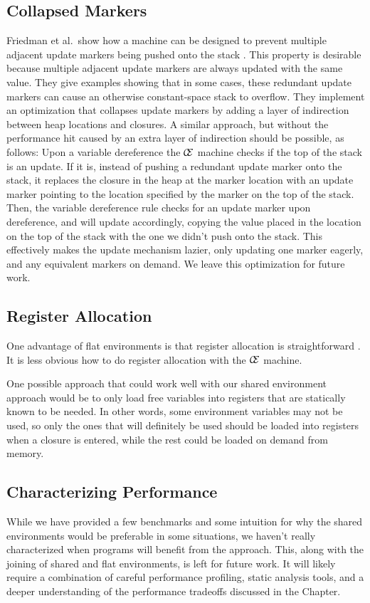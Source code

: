\subsection{Collapsed Markers}
Friedman et al.\ show how a machine can be designed to prevent multiple adjacent
update markers being pushed onto the stack \cite{lkm}.  This property is
desirable because multiple adjacent update markers are always updated with the
same value. They give examples showing that in some cases, these redundant
update markers can cause an otherwise constant-space stack to overflow.  They
implement an optimization that collapses update markers by adding a layer of
indirection between heap locations and closures. A similar approach,
but without the performance hit caused by an extra layer of indirection should
be possible, as follows: Upon a variable dereference the $\mathcal{\mathcal{C}
\mskip -4mu \mathcal{E}}$ machine checks if the top of the stack is an update.
If it is, instead of pushing a redundant update marker onto the stack, it
replaces the closure in the heap at the marker location with an update marker
pointing to the location specified by the marker on the top of the stack.  Then,
the variable dereference rule checks for an update marker upon dereference, and
will update accordingly, copying the value placed in the location on the top of
the stack with the one we didn't push onto the stack. This effectively makes the
update mechanism lazier, only updating one marker eagerly, and any equivalent
markers on demand. We leave this optimization for future work.

\subsection{Register Allocation} \label{sec:alloc}
One advantage of flat environments is that register allocation is
straightforward \cite{appel1992compiling,jonesstg,terei2010llvm}. It is less
obvious how to do register allocation with the $\mathcal{\mathcal{C} \mskip
-4mu \mathcal{E}}$ machine.  

One possible approach that could work well with our shared environment approach
would be to only load free variables into registers that are statically known to
be needed. In other words, some environment variables may not be used, so only
the ones that will definitely be used should be loaded into registers when a
closure is entered, while the rest could be loaded on demand from memory.

\subsection{Characterizing Performance}
While we have provided a few benchmarks and some intuition for why the shared
environments would be preferable in some situations, we haven't really
characterized when programs will benefit from the approach.  This, along with
the joining of shared and flat environments, is left for future work. It will
likely require a combination of careful performance profiling, static analysis
tools, and a deeper understanding of the performance tradeoffs discussed in the
Chapter.

